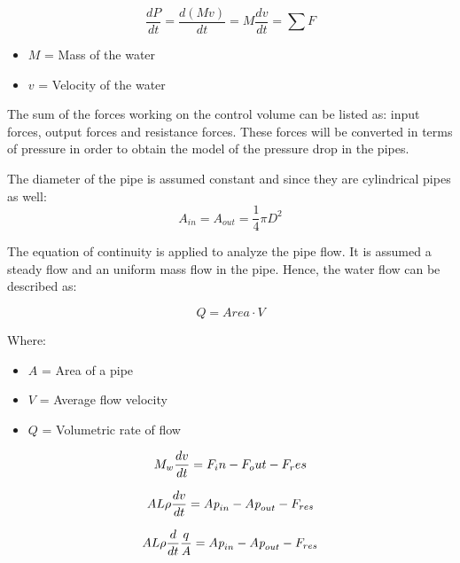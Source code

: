 \begin{equation}
  \frac{dP}{dt} = {\frac{d(M v)}{dt}} = M \frac{dv}{dt} = \sum F
\end{equation} 

\begin{itemize}
  \item  $M$ = Mass of the water
  \item $v$ = Velocity of the water
\end{itemize}

The sum of the forces working on the control volume can be listed as: input forces, output forces and resistance forces.  
These forces will be converted in terms of pressure in order to obtain the model of the pressure drop in the pipes. 

The diameter of the pipe is assumed constant and since they are cylindrical pipes as well:
\begin{equation}
  A_{in} = A_{out} = \frac{1}{4}\pi D^{2}
\end{equation}

The equation of continuity is applied to analyze the pipe flow. It is assumed a steady flow and an uniform 
mass flow in the pipe. Hence, the water flow can be described as: 

\begin{equation}
  Q=Area \cdot V
	\label{EquationOfContinuity}
\end{equation}

Where: 

\begin{itemize}
  \item  $A$ = Area of a pipe
  \item $V$ = Average flow velocity
  \item $Q$ = Volumetric rate of flow
\end{itemize}

\begin{equation}
  M_w \frac{dv}{dt} = F_in - F_out - F_res \\
\end{equation}

\begin{equation}
    A L \rho \frac{dv}{dt} = A \textit{p}_{in} - A \textit{p}_{out} - F_{res} \\
\end{equation}

\begin{equation}
    A L \rho \frac{d}{dt} \frac{q}{A} = A \textit{p}_{in} - A \textit{p}_{out} - F_{res} \\
\end{equation}

